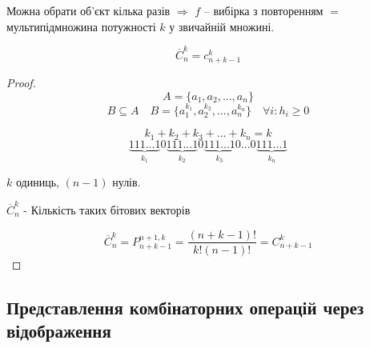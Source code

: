 \begin{definition}
    Можна обрати об'єкт кілька разів $\Rightarrow$
    $f$ -- вибірка з повторенням $=$
    мультипідмножина потужності $k$ у звичайній множині.
\end{definition}

\begin{claim}
    $$\overline{C}_n^k = c_{n+k-1}^{k}$$
\end{claim}
\begin{proof}
    $$A = \{ a_1, a_2, ..., a_n \}$$
    $$B \subseteq A \quad B = \{ a_1^{k_1}, a_2^{k_2}, ..., a_n^{k_n} \} \quad \forall i: h_i \geqslant 0$$

    \begin{equation*}
        k_1 + k_2 + k_3 + ... + k_n = k
    \end{equation*}
    \begin{equation*}
        \underbrace{111...1}_{k_1}0\underbrace{111...1}_{k_2}0\underbrace{111...1}_{k_3}0...0\underbrace{111...1}_{k_n}
    \end{equation*}

    $k$ одиниць, $(n - 1)$ нулів.

    $\overline{C}_n^k$ - Кількість таких бітових векторів

    \begin{equation*}
        \overline{C}_n^k = P_{n + k - 1}^{n + 1, k} = \frac{(n + k - 1)!}{k!(n-1)!} = C_{n + k - 1}^k
    \end{equation*}
\end{proof}

\subsection{Представлення комбінаторних операцій через відображення}


